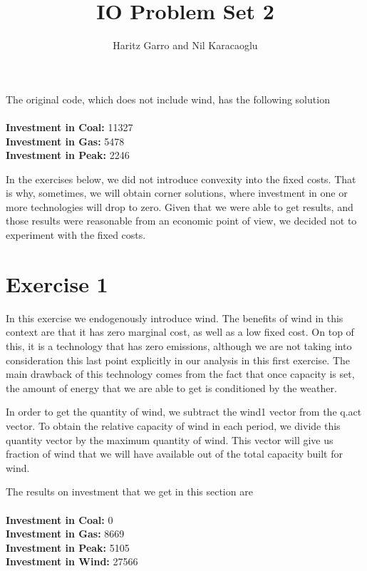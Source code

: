 \documentclass[12 pt]{article}
\title{IO Problem Set 2}
\author{Haritz Garro and Nil Karacaoglu}
\begin{document}
\maketitle

The original code, which does not include wind, has the following solution \\
\\
\textbf{Investment in Coal:} 11327 \\
\textbf{Investment in Gas:}  5478  \\
\textbf{Investment in Peak:} 2246

In the exercises below, we did not introduce convexity into the fixed costs. That is why, sometimes, we will obtain corner solutions, where investment in one or more technologies will drop to zero. Given that we were able to get results, and those results were reasonable from an economic point of view, we decided not to experiment with the fixed costs.


\section*{Exercise 1}

In this exercise we endogenously introduce wind. The benefits of wind in this context are that it has zero marginal cost, as well as a low fixed cost. On top of this, it is a technology that has zero emissions, although we are not taking into consideration this last point explicitly in our analysis in this first exercise. The main drawback of this technology comes from the fact that once capacity is set, the amount of energy that we are able to get is conditioned by the weather. 

In order to get the quantity of wind, we subtract the wind1 vector from the q.act vector. To obtain the relative capacity of wind in each period, we divide this quantity vector by the maximum quantity of wind. This vector will give us fraction of wind that we will have available out of the total capacity built for wind. 

The results on investment that we get in this section are \\
\\
\textbf{Investment in Coal:} 0 \\
\textbf{Investment in Gas:}  8669  \\
\textbf{Investment in Peak:} 5105 \\
\textbf{Investment in Wind:} 27566 \\
\\
\end{document}
